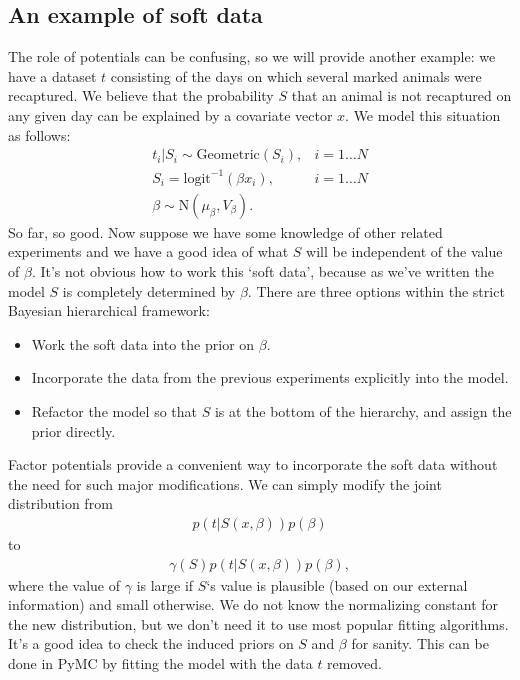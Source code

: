 \documentclass[letterpaper,10pt,english]{sphinxmanual}
\begin{document}
\subsection{An example of soft data}
\label{modelbuilding:an-example-of-soft-data}
The role of potentials can be confusing, so we will provide another example: we have a dataset $t$ consisting of the days on which several marked animals were recaptured. We believe that the probability $S$ that an animal is not recaptured on any given day can be explained by a covariate vector $x$. We model this situation as follows:
\begin{eqnarray*}
    t_i|S_i \sim \text{Geometric}(S_i), & i=1\ldots N\\
    S_i = \text{logit}^{-1}(\beta x_i), &i=1\ldots N\\
    \beta\sim \text{N}(\mu_\beta, V_\beta).
\end{eqnarray*}
So far, so good. Now suppose we have some knowledge of other related experiments and we have a good idea of what $S$ will be independent of the value of $\beta$. It's not obvious how to work this `soft data', because as we've written the model $S$ is completely determined by $\beta$. There are three options within the strict Bayesian hierarchical framework:
\begin{itemize}
\item {} 
Work the soft data into the prior on $\beta$.

\item {} 
Incorporate the data from the previous experiments explicitly into the model.

\item {} 
Refactor the model so that $S$ is at the bottom of the hierarchy, and
assign the prior directly.

\end{itemize}

Factor potentials provide a convenient way to incorporate the soft data without the need for such major modifications. We can simply modify the joint distribution from
\begin{eqnarray*}
    p(t|S(x,\beta)) p(\beta)
\end{eqnarray*}
to
\begin{eqnarray*}
    \gamma(S) p(t|S(x,\beta)) p(\beta),
\end{eqnarray*}
where the value of $\gamma$ is large if $S$`s value is plausible (based on our external information) and small otherwise. We do not know the normalizing constant for the new distribution, but we don't need it to use most popular fitting algorithms. It's a good idea to check the induced priors on $S$ and $\beta$ for sanity. This can be done in PyMC by fitting the model with the data $t$ removed.
\end{document}
